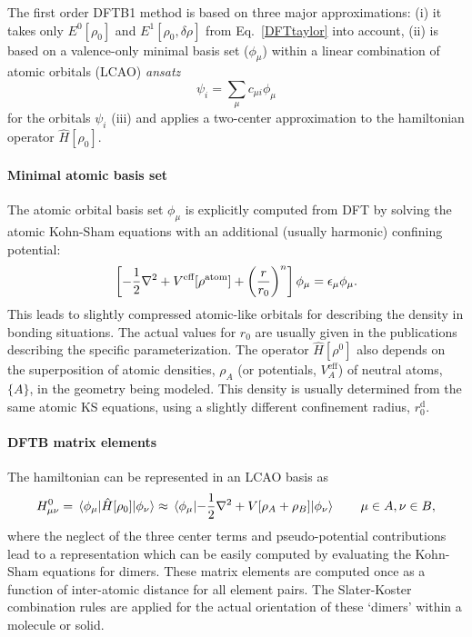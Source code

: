 \documentclass[reprint,onecolumn,superscriptaddress]{revtex4-1}
\begin{document}
The first order DFTB1 method is based on three major approximations: (i) it
takes only $E^0[\rho_0]$ and $ E^1[\rho_0,\delta \rho]$ from
Eq.~\eqref{DFTtaylor} into account, (ii) is based on a valence-only minimal
basis set ($\phi_\mu$) within a linear combination of atomic orbitals (LCAO)
{\it ansatz}
\begin{equation}
  \psi_i=\sum_\mu c_{\mu i}\phi_\mu
\end{equation}
for the orbitals $\psi_i$ (iii) and applies a two-center approximation to the
hamiltonian operator $\hat{H}[\rho_0]$.

\paragraph{Minimal atomic basis set}
The atomic orbital basis set $\phi_\mu$ is explicitly computed from DFT by
solving the atomic Kohn-Sham equations with an additional (usually harmonic)
confining potential:
\begin{equation}
  \left[ -\frac{1}{2} \nabla^2 + V^{\mbox{\scriptsize
        eff}}[\rho^{\mbox{\scriptsize atom}}] + \left( \frac{r}{r_0}\right)^n
    \right] \phi_{\mu} = \epsilon_{\mu} \phi_{\mu} \text.\label{eqn:DFTBatom}
\end{equation}
This leads to slightly compressed atomic-like orbitals for describing the
density in bonding situations. The actual values for $r_0$ are usually given in
the publications describing the specific parameterization.  The operator
$\hat{H}[\rho^0]$ also depends on the superposition of atomic densities,
$\rho_A$ (or potentials, $V_A^\text{eff}$) of neutral atoms, $\{A\}$, in the
geometry being modeled.  This density is usually determined from the same atomic
KS equations, using a slightly different confinement radius, $r_0^\text{d}$.


\paragraph{DFTB matrix elements}

The hamiltonian can be represented in an LCAO basis as
\begin{eqnarray}
  H_{\mu\nu}^0 = \mel{\phi_{\mu}}{\hat{H}[\rho_0]}{\phi_{\nu}} \approx
  \mel{\phi_{\mu}}{- \frac{1}{2} \nabla^2 +V[\rho_A +
      \rho_B]}{\phi_{\nu}}\qquad{\mu \in A, \nu \in B},
  \label{eqn:matelements}
\end{eqnarray}
where the neglect of the three center terms and pseudo-potential
contributions\cite{ElstnerSeifertBBA2014} lead to a representation which can be
easily computed by evaluating the Kohn-Sham equations for dimers. These matrix
elements are computed once as a function of inter-atomic distance for all element
pairs. The Slater-Koster\cite{PhysRev.94.1498} combination rules are applied for
the actual orientation of these `dimers' within a molecule or solid.
\end{document}
